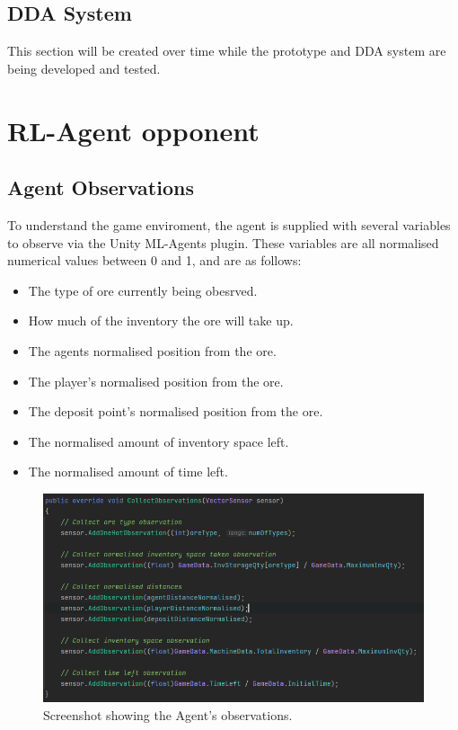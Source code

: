 \begin{spacing}{2.0}
	\subsection{DDA System}

	This section will be created over time while the prototype and DDA system are being developed and tested.

	\section{RL-Agent opponent}

	\subsection{Agent Observations}

	To understand the game enviroment, the agent is supplied with several variables to observe via the Unity ML-Agents plugin. These variables are all normalised numerical values between 0 and 1, and are as follows:

	\begin{itemize}
		\item The type of ore currently being obesrved.
		\item How much of the inventory the ore will take up.
		\item The agents normalised position from the ore.
		\item The player's normalised position from the ore.
		\item The deposit point's normalised position from the ore.
		\item The normalised amount of inventory space left.
		\item The normalised amount of time left.
	\end{itemize}

	\begin{figure}[ht]
		\centering
		\includegraphics[width=5in, fbox]{Figures/Observations.png}
		\caption{Screenshot showing the Agent's observations.}
		\label{fig:observations}
	\end{figure}


\end{spacing}
